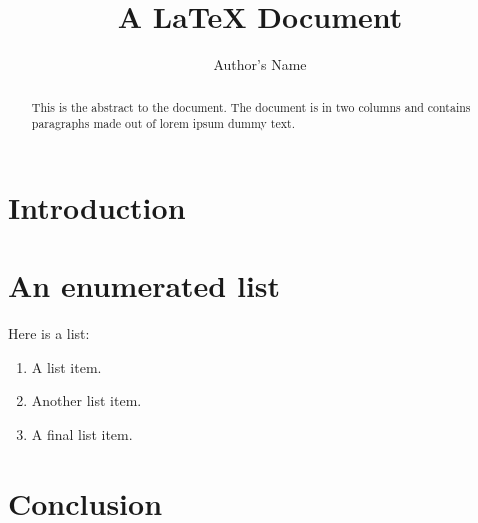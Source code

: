 \documentclass[a4paper,twocolumn]{article}
\title{A \LaTeX{} Document}
\author{Author's Name}
\begin{document}
\maketitle

\begin{abstract}
This is the abstract to the document. The document is in two columns and
contains paragraphs made out of lorem ipsum dummy text.
\end{abstract}

\section{Introduction}

\lipsum[1]

\section{An enumerated list}

Here is a list:

\begin{enumerate}
    \item A list item.
    \item Another list item.
    \item A final list item.
\end{enumerate}

\section{Conclusion}

\lipsum[2-4]
\end{document}
